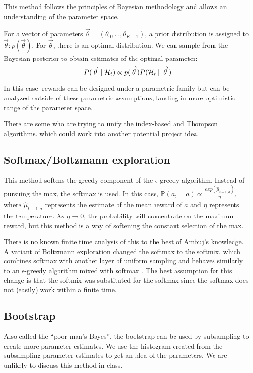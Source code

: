 \documentclass[11pt]{article}
\begin{document}
This method follows the principles of Bayesian methodology and allows an understanding of the parameter space.

For a vector of parameters $\overrightarrow {\theta} = (\theta_0, \ldots, \theta_{K-1})$, a prior distribution is assigned to $\overrightarrow {\theta} : p(\overrightarrow{\theta})$.  For $\overrightarrow{\theta}$, there is an optimal distribution.  We can sample from the Bayesian posterior to obtain estimates of the optimal parameter: 
\[
\ P(\overrightarrow{\theta} \mid \mathcal{H}_{t}) \propto p(\overrightarrow{\theta}) P(\mathcal{H}_{t} \mid \overrightarrow{\theta})
\]

In this case, rewards can be designed under a parametric family but can be analyzed outside of these parametric assumptions, landing in more optimistic range of the parameter space.

There are some who are trying to unify the index-based and Thompson algorithms, which could work into another potential project idea.

\subsection{Softmax/Boltzmann exploration}
This method softens the greedy component of the $\epsilon$-greedy algorithm.  Instead of pursuing the max, the softmax is used.  In this case, $\mathbb{P}(a_{t}=a) \propto \frac{exp(\hat{\mu}_{t-1,a})}{\eta}$, where $\hat{\mu}_{t-1,a}$ represents the estimate of the mean reward of $a$ and $\eta$ represents the temperature.  As $\eta\rightarrow 0$, the probability will concentrate on the maximum reward, but this method is a way of softening the constant selection of the max.

There is no known finite time analysis of this to the best of Ambuj's knowledge.  A variant of Boltzmann exploration changed the softmax to the softmix, which combines softmax with another layer of uniform sampling and behaves similarly to an $\epsilon$-greedy algorithm mixed with softmax \cite{cesabianchi1998finite}.  The best assumption for this change is that the softmix was substituted for the softmax since the softmax does not (easily) work within a finite time. 

\subsection{Bootstrap}
Also called the ``poor man's Bayes'', the bootstrap can be used by subsampling to create more parameter estimates.  We use the histogram created from the subsampling parameter estimates to get an idea of the parameters.  We are unlikely to discuss this method in class.
 
\end{document}
